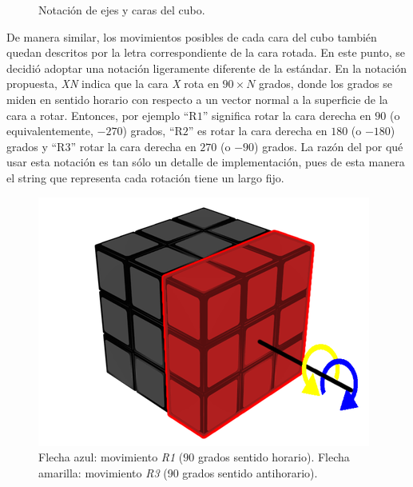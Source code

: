 \begin{figure}[h!]
	\centering
	\hfill
	\caption{Notación de ejes y caras del cubo.}
\end{figure}
De manera similar, los movimientos posibles de cada cara del cubo también quedan descritos por la letra correspondiente de la cara rotada.
En este punto, se decidió adoptar una notación ligeramente diferente de la estándar.
En la notación propuesta, \textit{XN} indica que la cara \textit{X} rota en $90 \times N$ grados, donde los grados se miden en sentido horario con respecto a un vector normal a la superficie de la cara a rotar.
Entonces, por ejemplo ``R$1$'' significa rotar la cara derecha en $90$ (o equivalentemente, $-270$) grados, ``R$2$'' es rotar la cara derecha en $180$ (o $-180$) grados y ``R$3$'' rotar la cara derecha en $270$ (o $-90$) grados.
La razón del por qué usar esta notación es tan sólo un detalle de implementación, pues de esta manera el string que representa cada rotación tiene un largo fijo.

\begin{figure}[h!]
	\centering
	\includegraphics[scale=0.3]{figures/R1}
	\caption[Ejemplo de rotación.]{Flecha azul: movimiento \textit{R1} ($90$ grados sentido horario). Flecha amarilla: movimiento \textit{R3} (90 grados sentido antihorario).}
	\label{moveR}
\end{figure}

